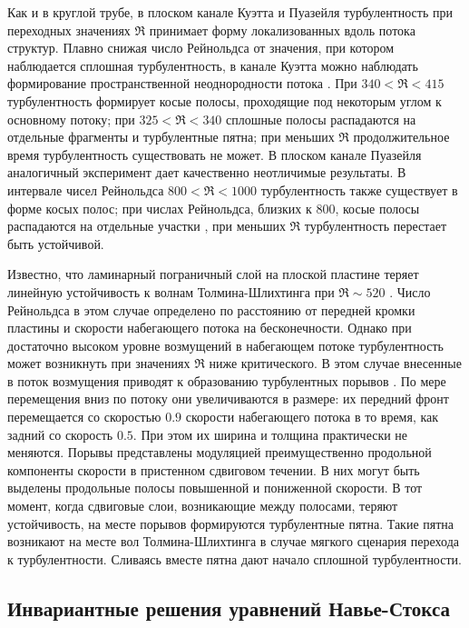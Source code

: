 Как и в круглой трубе, в плоском канале Куэтта \cite{Prigent2002, Barkley2005} и Пуазейля турбулентность при переходных значениях $\Re$ принимает форму локализованных вдоль потока структур. Плавно снижая число Рейнольдса от значения, при котором наблюдается сплошная турбулентность, в канале Куэтта можно наблюдать формирование пространственной неоднородности потока \cite{Duguet2010Couette}. При $340 < \Re < 415$ турбулентность формирует косые полосы, проходящие под некоторым углом к основному потоку; при $325 < \Re < 340$ сплошные полосы распадаются на отдельные фрагменты и турбулентные пятна; при меньших $\Re$ продолжительное время турбулентность существовать не может. В плоском канале Пуазейля аналогичный эксперимент дает качественно неотличимые результаты. В интервале чисел Рейнольдса $800 < \Re < 1000$ турбулентность также существует в форме косых полос; при числах Рейнольдса, близких к 800, косые полосы распадаются на отдельные участки \cite{Tuckerman2014, Lernoult2014, Sano2015}, при меньших $\Re$ турбулентность перестает быть устойчивой. 

Известно, что ламинарный пограничный слой на плоской пластине теряет линейную устойчивость к волнам Толмина-Шлихтинга при $\Re \sim 520$ \cite{Schlichting2004}. Число Рейнольдса в этом случае определено по расстоянию от передней кромки пластины и скорости набегающего потока на бесконечности. Однако при достаточно высоком уровне возмущений в набегающем потоке турбулентность может возникнуть при значениях $\Re$ ниже критического. В этом случае внесенные в поток возмущения приводят к образованию турбулентных порывов \cite{Katasonov2014}. По мере перемещения вниз по потоку они увеличиваются в размере: их передний фронт перемещается со скоростью $0.9$ скорости набегающего потока в то время, как задний со скорость $0.5$. При этом их ширина и толщина практически не меняются. Порывы представлены модуляцией преимущественно продольной компоненты скорости в пристенном сдвиговом течении. В них могут быть выделены продольные полосы повышенной и пониженной скорости. В тот момент, когда сдвиговые слои, возникающие между полосами, теряют устойчивость, на месте порывов формируются турбулентные пятна. Такие пятна возникают на месте вол Толмина-Шлихтинга в случае мягкого сценария перехода к турбулентности. Сливаясь вместе пятна дают начало сплошной турбулентности. 


	\subsection{Инвариантные решения уравнений Навье-Стокса}



